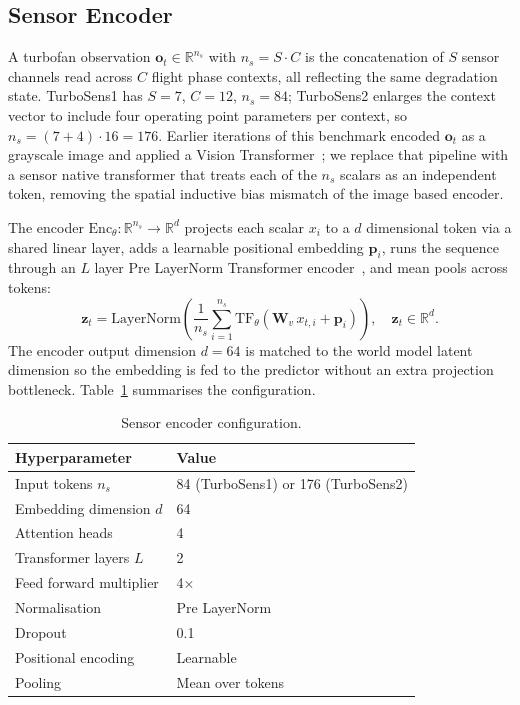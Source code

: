 \subsection{Sensor Encoder}
\label{app:sensor_encoder}
\label{sec:sensor_encoder}

A turbofan observation $\mathbf{o}_t \in \mathbb{R}^{n_s}$ with
$n_s = S \cdot C$ is the concatenation of $S$ sensor channels read across
$C$ flight phase contexts, all reflecting the same degradation state.
TurboSens1 has $S{=}7$, $C{=}12$, $n_s{=}84$; TurboSens2 enlarges the
context vector to include four operating point parameters per context,
so $n_s = (7+4) \cdot 16 = 176$. Earlier iterations of this benchmark
encoded $\mathbf{o}_t$ as a grayscale image and applied a Vision
Transformer~\citep{dosovitskiy2021image}; we replace that pipeline with
a sensor native transformer that treats each of the $n_s$ scalars as an
independent token, removing the spatial inductive bias mismatch of the
image based encoder.

The encoder $\mathrm{Enc}_\theta : \mathbb{R}^{n_s} \to \mathbb{R}^d$
projects each scalar $x_i$ to a $d$ dimensional token via a shared
linear layer, adds a learnable positional embedding $\mathbf{p}_i$,
runs the sequence through an $L$ layer Pre LayerNorm Transformer
encoder~\citep{xiong2020layer}, and mean pools across tokens:
\begin{equation}
  \mathbf{z}_t = \mathrm{LayerNorm}\!\left(
    \frac{1}{n_s}\sum_{i=1}^{n_s}
      \mathrm{TF}_\theta\!\left(
        \mathbf{W}_v\, x_{t,i} + \mathbf{p}_i
      \right)
  \right), \quad \mathbf{z}_t \in \mathbb{R}^d.
  \label{eq:sensor_encoder}
\end{equation}
The encoder output dimension $d{=}64$ is matched to the world model
latent dimension so the embedding is fed to the predictor without an
extra projection bottleneck. Table~\ref{tab:sensor_encoder} summarises
the configuration.

\begin{table}[h]
  \centering
  \caption{Sensor encoder configuration.}
  \label{tab:sensor_encoder}
  \begin{tabular}{ll}
    \toprule
    Hyperparameter & Value \\
    \midrule
    Input tokens $n_s$       & 84 (TurboSens1) or 176 (TurboSens2) \\
    Embedding dimension $d$  & 64 \\
    Attention heads          & 4 \\
    Transformer layers $L$   & 2 \\
    Feed forward multiplier  & 4$\times$ \\
    Normalisation            & Pre LayerNorm \\
    Dropout                  & 0.1 \\
    Positional encoding      & Learnable \\
    Pooling                  & Mean over tokens \\
    \bottomrule
  \end{tabular}
\end{table}


